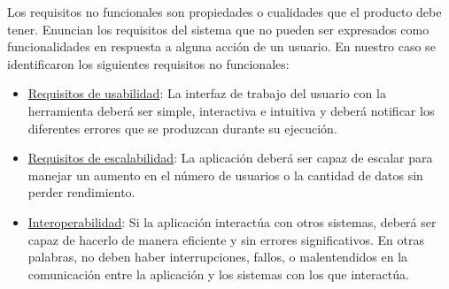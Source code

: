 Los requisitos no funcionales son propiedades o cualidades que el producto debe tener. Enuncian los requisitos del sistema que no pueden ser expresados como funcionalidades en respuesta a alguna acción de un usuario. En nuestro caso se identificaron los siguientes requisitos no funcionales:
        
\begin{itemize}
    \item \underline{Requisitos de usabilidad}: La interfaz de trabajo del usuario con la herramienta deberá ser simple, interactiva e intuitiva y deberá notificar los diferentes errores que se produzcan durante su ejecución.
    \item \underline{Requisitos de escalabilidad}: La aplicación deberá ser capaz de escalar para manejar un aumento en el número de usuarios o la cantidad de datos sin perder rendimiento.     
    \item \underline{Interoperabilidad}: Si la aplicación interactúa con otros sistemas, deberá ser capaz de hacerlo de manera eficiente y sin errores significativos. En otras palabras, no deben haber interrupciones, fallos, o malentendidos en la comunicación entre la aplicación y los sistemas con los que interactúa.
\end{itemize}

